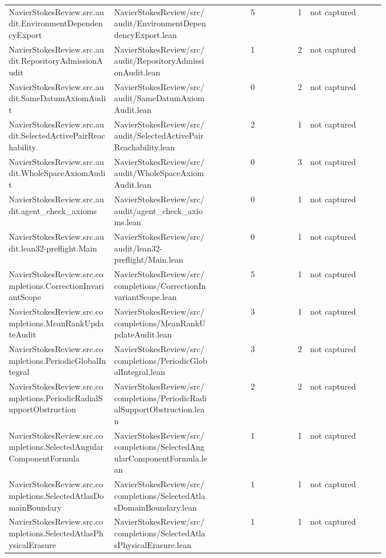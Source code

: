\documentclass[10pt]{article}
\begin{document}
\begin{longtable}{p{0.28\linewidth}p{0.27\linewidth}r r p{0.20\linewidth}}
NavierStokesReview.src.audit.EnvironmentDependencyExport & NavierStokesReview/src/audit/EnvironmentDependencyExport.lean & 5 & 1 & not captured\\
NavierStokesReview.src.audit.RepositoryAdmissionAudit & NavierStokesReview/src/audit/RepositoryAdmissionAudit.lean & 1 & 2 & not captured\\
NavierStokesReview.src.audit.SameDatumAxiomAudit & NavierStokesReview/src/audit/SameDatumAxiomAudit.lean & 0 & 2 & not captured\\
NavierStokesReview.src.audit.SelectedActivePairReachability & NavierStokesReview/src/audit/SelectedActivePairReachability.lean & 2 & 1 & not captured\\
NavierStokesReview.src.audit.WholeSpaceAxiomAudit & NavierStokesReview/src/audit/WholeSpaceAxiomAudit.lean & 0 & 3 & not captured\\
NavierStokesReview.src.audit.agent\_check\_axioms & NavierStokesReview/src/audit/agent\_check\_axioms.lean & 0 & 1 & not captured\\
NavierStokesReview.src.audit.lean32-preflight.Main & NavierStokesReview/src/audit/lean32-preflight/Main.lean & 0 & 1 & not captured\\
NavierStokesReview.src.completions.CorrectionInvariantScope & NavierStokesReview/src/completions/CorrectionInvariantScope.lean & 5 & 1 & not captured\\
NavierStokesReview.src.completions.MeanRankUpdateAudit & NavierStokesReview/src/completions/MeanRankUpdateAudit.lean & 3 & 1 & not captured\\
NavierStokesReview.src.completions.PeriodicGlobalIntegral & NavierStokesReview/src/completions/PeriodicGlobalIntegral.lean & 3 & 2 & not captured\\
NavierStokesReview.src.completions.PeriodicRadialSupportObstruction & NavierStokesReview/src/completions/PeriodicRadialSupportObstruction.lean & 2 & 2 & not captured\\
NavierStokesReview.src.completions.SelectedAngularComponentFormula & NavierStokesReview/src/completions/SelectedAngularComponentFormula.lean & 1 & 1 & not captured\\
NavierStokesReview.src.completions.SelectedAtlasDomainBoundary & NavierStokesReview/src/completions/SelectedAtlasDomainBoundary.lean & 1 & 1 & not captured\\
NavierStokesReview.src.completions.SelectedAtlasPhysicalErasure & NavierStokesReview/src/completions/SelectedAtlasPhysicalErasure.lean & 1 & 1 & not captured\\

\end{longtable}
\end{document}
